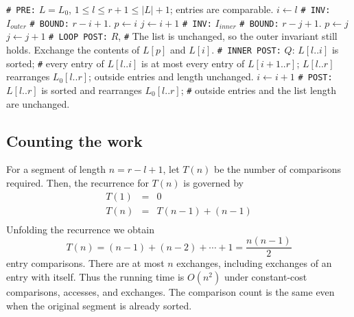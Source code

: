 \begin{algorithm}[H]
\begin{algorithmic}[1]
\Statex \texttt{\# PRE:} $L=L_0$,
$1\leq l\leq r+1\leq |L|+1$; entries are comparable.
\State $i\leftarrow l$
\Statex \texttt{\# INV:} $I_{outer}$
\Statex \texttt{\# BOUND:} $r-i+1$.
    \State  $p\leftarrow i$
    \State $j\leftarrow i+1$
   \Statex \hspace{0.45in} \texttt{\# INV:} $I_{inner}$
   \Statex \hspace{0.45in} \texttt{\# BOUND:} $r-j+1$.
           \State $p\leftarrow j$
     \EndIf
          \State $j\leftarrow j+1$
    \EndWhile
    \Statex \hspace{0.45in} \texttt{\# LOOP POST:} $R$,
    \Statex \hspace{0.45in} \texttt{\#} The list is unchanged, so the outer invariant still holds.
    \State Exchange the contents of $L[p]$ and $L[i]$.
    \Statex \hspace{0.45in} \texttt{\# INNER POST:} $Q$: $L[l..i]$ is sorted;
    \Statex \hspace{0.45in} \texttt{\#} every entry of $L[l..i]$ is at most every entry of $L[i+1..r]$; $L[l..r]$ rearranges $L_0[l..r]$;
               outside entries and length unchanged.
    \State $i\leftarrow i+1$
\EndWhile
\Statex \texttt{\# POST:} $L[l..r]$ is sorted and rearranges $L_0[l..r]$;
\Statex \texttt{\#} outside entries and the list length are unchanged.
\EndProcedure
\end{algorithmic}
\caption{The Selection Sort Algorithm.}
\end{algorithm}

\subsection{Counting the work}

For a segment of length $n=r-l+1$, let $T(n)$ be the number of comparisons required. Then, the recurrence for $T(n)$ is governed by
\[
\begin{array}{lcl}
T(1) & = & 0 \\
T(n) & = & T(n-1) + (n-1) \\
\end{array}
\]
Unfolding the recurrence we obtain
\[
T(n) = (n-1)+(n-2)+\cdots+1=\frac{n(n-1)}{2}
\]
entry comparisons. There are at most $n$ exchanges, including
exchanges of an entry with itself. Thus the running time is $O(n^2)$
under constant-cost comparisons, accesses, and exchanges.
The comparison count is the same even when the original segment
is already sorted.

